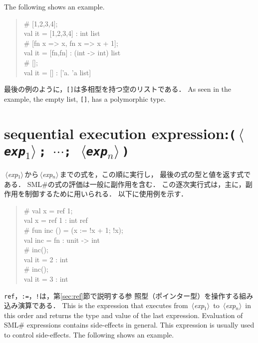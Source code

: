 \documentclass{jbook}
\newcommand{\txt}[2]{#2}
\newcommand{\smlsharp}{SML\#}
\newcommand{\code}[1]{\mbox{\large\tt #1}}
\newcommand{\nonterm}[1]{\mbox{$\,\langle$}{\it #1}\mbox{$\rangle\,$}}
\newcommand{\term}[1]{\mbox{{\tt #1}}}
\newenvironment{program}{\begin{quote}\begin{tt}}%
                        {\end{tt}\end{quote}}
\begin{document}
	The following shows an example.
\fi%


\begin{program}
\# [1,2,3,4];
\\
val it = [1,2,3,4] : int list
\\
\# [fn x => x, fn x => x + 1];
\\
val it = [fn,fn] : (int -> int) list
\\
\# [];
\\
val it = [] : ['a. 'a list]
\end{program}

\ifjp%
	最後の例のように，\code{[]}は多相型を持つ空のリストである．
\else%
	As seen in the example, the empty list, \code{[]}, has a
polymorphic type.
\fi%

	
\section{\txt{逐次実行式}{sequential execution expression}:\term{(\nonterm{exp$_1$}; $\cdots$; \nonterm{exp$_n$})}}

\ifjp%
	\nonterm{exp$_1$}から\nonterm{exp$_n$}までの式を，この順に実行し，
最後の式の型と値を返す式である．
	\smlsharp{}の式の評価は一般に副作用を含む．
	この逐次実行式は，主に，副作用を制御するために用いられる．
	以下に使用例を示す．
\begin{program}
\# val x = ref 1;
\\
val x = ref 1 : int ref
\\
\# fun inc () = (x := !x + 1; !x);
\\
val inc = fn : unit -> int
\\
\# inc();
\\
val it = 2 : int
\\
\# inc();
\\
val it = 3 : int
\end{program}
	\code{ref}，\code{:=}，\code{!}は，第\ref{sec:ref}節で説明する参
照型（ポインター型）を操作する組み込み演算である．
\else%
	This is the expression that executes
from \nonterm{exp$_1$} to \nonterm{exp$_n$} in this order
and returns the type and value of the last expression.
	Evaluation of \smlsharp{} expressions contains side-effects in
general.
	This expression is usually used to control side-effects.
	The following shows an example.
\end{document}
